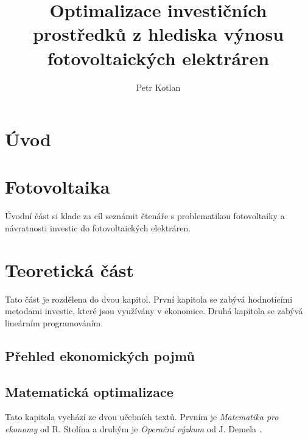 \documentclass[a4paper, 12pt]{report}
\author{Petr Kotlan}
\title{Optimalizace investičních prostředků z hlediska výnosu fotovoltaických elektráren}
\date{}
\begin{document}

\thispagestyle{empty}
\mbox{}




\thispagestyle{empty}
\mbox{}
\newpage



\thispagestyle{empty}
\mbox{}
\newpage



\thispagestyle{empty}
\mbox{}
\newpage

\tableofcontents

\renewcommand{\chaptername}{Úvod}
\chapter*{Úvod}

\chapter{Fotovoltaika}

Úvodní část si klade za cíl seznámit čtenáře s problematikou fotovoltaiky a návratnosti investic do fotovoltaických elektráren.



\renewcommand{\chaptername}{Teoretická část}
\chapter{Teoretická část}

Tato část je rozdělena do dvou kapitol. První kapitola se zabývá hodnotícími metodami investic, které jsou využívány v ekonomice.
Druhá kapitola se zabývá lineárním programováním.

\section{Přehled ekonomických pojmů}


\section{Matematická optimalizace}
Tato kapitola vychází ze dvou učebních textů. Prvním je \textit{Matematika pro ekonomy} od R. Stolína \cite{matematika_pro_ekonomy} a druhým je \textit{Operační výzkum} od J. Demela \cite{demel}.
\end{document}
